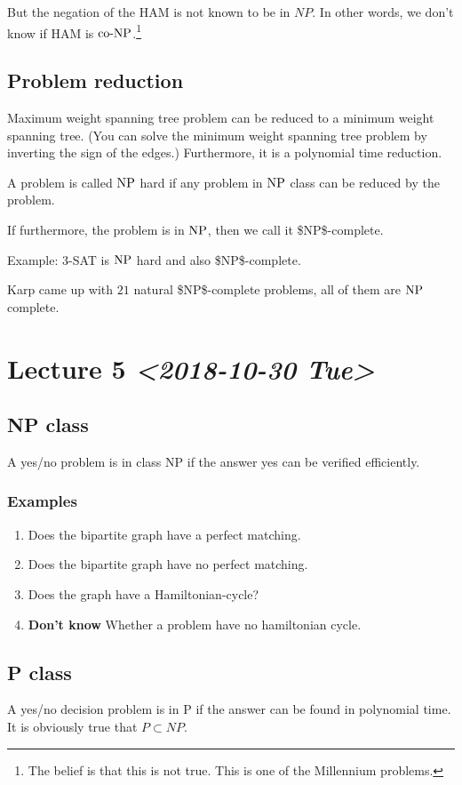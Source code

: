 \documentclass[11pt]{article}
\def\NP{\textup{NP}}
\def\coNP{\textup{co-NP}}
\begin{document}
But the negation of the HAM is not known to be in \(NP\). In other words, we
don't know if HAM is \(\coNP\).\footnote{The belief is that this is not true. This is one of the Millennium problems.}
\subsection{Problem reduction}
\label{sec:org6bfcb90}
Maximum weight spanning tree problem can be reduced to a minimum weight
spanning tree. (You can solve the minimum weight spanning tree problem by
inverting the sign of the edges.) Furthermore, it is a polynomial time
reduction.

A problem is called \(\NP\) hard if any problem in \(\NP\) class can be reduced
by the problem.

If furthermore, the problem is in \(\NP\), then we call it \$\NP\$-complete.

Example: 3-SAT is \(\NP\) hard and also \$\NP\$-complete. 

Karp came up with \(21\) natural \$\NP\$-complete problems, all of them are \(\NP\)
complete.
\section{Lecture 5 \textit{<2018-10-30 Tue>}}
\label{sec:org05f1065}
\subsection{NP class}
\label{sec:orgb944b59}
A yes/no problem is in class NP if the answer yes can be verified
efficiently.
\subsubsection{Examples}
\label{sec:orga4e619e}
\begin{enumerate}
\item Does the bipartite graph have a perfect matching.
\item Does the bipartite graph have no perfect matching.
\item Does the graph have a Hamiltonian-cycle?
\item \textbf{Don't know} Whether a problem have no hamiltonian cycle.
\end{enumerate}
\subsection{P class}
\label{sec:orge51bb20}
A yes/no decision problem is in P if the answer can be found in polynomial
time. It is obviously true that \(P \subset NP\).
\end{document}
